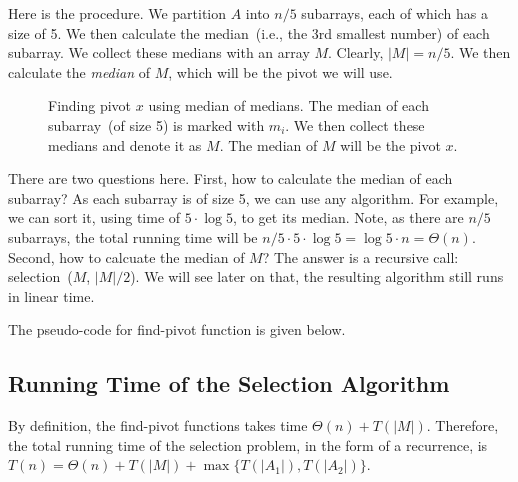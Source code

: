 Here is the procedure. We partition $A$ into $n/5$ subarrays, each of which has a size of 5.
We then calculate the median~(i.e., the 3rd smallest number) of each subarray. We collect these medians
with an array $M$. Clearly, $|M| = n/5$. We then calculate the \emph{median} of $M$, which will be the pivot we will use.

\begin{figure}[h!]
\centering{}
\caption{Finding pivot $x$ using median of medians. The median of each subarray~(of size 5) is marked with $m_i$.
We then collect these medians and denote it as $M$. The median of $M$ will be the pivot $x$.}
\label{fig:median}
\end{figure}

There are two questions here. First, how to calculate the median of each subarray?
As each subarray is of size 5, we can use any algorithm. For example, we can sort it, using time of $5 \cdot \log 5$, to get its median.
Note, as there are $n/5$ subarrays, the total running time will be $n/5\cdot 5\cdot \log 5 = \log 5\cdot n = \Theta(n)$.
Second, how to calcuate the median of $M$? The answer is a recursive call: selection~($M$, $|M|/2$).
We will see later on that, the resulting algorithm still runs in linear time.

The pseudo-code for find-pivot function is given below.

\begin{minipage}{0.8\textwidth}
	\xxx
	\aab {\textcolor{blue}{if $|A| < 5$: find~(e.g., by sorting $A$) and return the median of $A$;}}\xxx
	\xxx
	\xxx
	\xxx
	\xxx
	\xxx
\end{minipage}

\subsection*{Running Time of the Selection Algorithm}

By definition, the find-pivot functions takes time $\Theta(n) + T(|M|)$.
Therefore, the total running time of the selection problem, in the form of a recurrence,
is $T(n) = \Theta(n) + T(|M|) + \max\{T(|A_1|), T(|A_2|)\}$.

